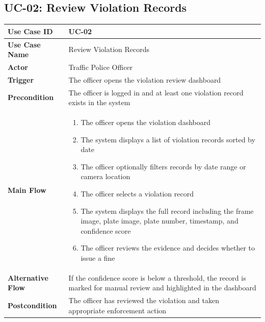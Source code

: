 \subsection{UC-02: Review Violation Records}
\begin{subsecbody}
\centering
\begin{tabularx}{\textwidth}{|p{3.5cm}|X|}
\hline
\textbf{Use Case ID} & UC-02 \\
\hline
\textbf{Use Case Name} & Review Violation Records \\
\hline
\textbf{Actor} & Traffic Police Officer \\
\hline
\textbf{Trigger} & The officer opens the violation review dashboard \\
\hline
\textbf{Precondition} & The officer is logged in and at least one violation record exists in the system \\
\hline
\textbf{Main Flow} &
\begin{enumerate}[leftmargin=20pt, topsep=0pt, itemsep=0pt]
    \item The officer opens the violation dashboard
    \item The system displays a list of violation records sorted by date
    \item The officer optionally filters records by date range or camera location
    \item The officer selects a violation record
    \item The system displays the full record including the frame image, plate image, plate number, timestamp, and confidence score
    \item The officer reviews the evidence and decides whether to issue a fine
\end{enumerate} \\
\hline
\textbf{Alternative Flow} & If the confidence score is below a threshold, the record is marked for manual review and highlighted in the dashboard \\
\hline
\textbf{Postcondition} & The officer has reviewed the violation and taken appropriate enforcement action \\
\hline
\end{tabularx}
\end{subsecbody}

